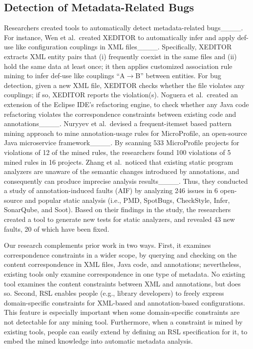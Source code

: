   \vspace{-.5em}
\subsection{Detection of Metadata-Related Bugs}

Researchers created tools to automatically detect metadata-related bugs____.
For instance, Wen et al.~created XEDITOR to automatically infer and apply def-use like configuration couplings in XML files____. Specifically, XEDITOR extracts XML entity pairs that (i) frequently coexist in the same files and (ii) hold the same data at least once; it then applies customized association rule mining to infer def-use like couplings ``A$\rightarrow$B'' between entities. For bug detection, given a new XML file, XEDITOR checks whether the file violates any couplings; if so, XEDITOR reports the violation(s). 
Noguera et al.~created an extension of the Eclipse IDE's refactoring engine, to check whether any Java code refactoring violates the
correspondence constraints between existing code and annotations____. 
Nuryyev et al.~devised a frequent-itemset based pattern mining approach to mine annotation-usage rules for MicroProfile, an open-source Java microservice framework____. 
By scanning 533 MicroProfile projects for violations of 12 of the mined rules, the researchers found 100 violations of 5 mined rules in 16 projects. 
Zhang et al.~noticed that existing static program analyzers are unaware of the semantic changes introduced by annotations, and consequently can produce imprecise analysis results____. Thus, they conducted a study of annotation-induced faults (AIF) by analyzing 246 issues in 6 open-source and popular static analysis (i.e., PMD, SpotBugs, CheckStyle, Infer, SonarQube, and Soot). Based on their findings in the study, the researchers created a tool to generate new tests for static analyzers, and revealed 43 new faults, 20 of which have been fixed.

Our research complements prior work in two ways. First, it examines correspondence constraints in a wider scope, by querying and checking on the content correspondence in XML files, Java code, and annotations; nevertheless, existing tools only examine correspondence in one type of metadata. 
No existing tool examines the content constraints between XML and annotations,  but \tool does so.
Second, RSL enables people (e.g., library developers) to freely express domain-specific constraints for XML-based and annotation-based configurations. This feature is especially important when some domain-specific constraints are not detectable for any mining tool.
Furthermore, when a constraint is mined by existing tools, people can easily extend \tool by defining an RSL specification for it, to embed the mined knowledge into automatic metadata analysis.

